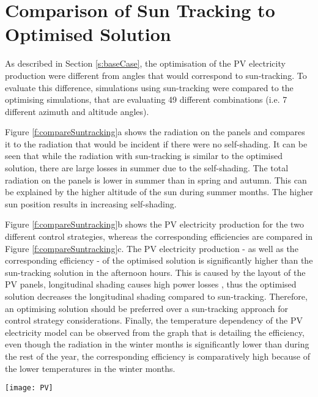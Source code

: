 \section{Comparison of Sun Tracking to Optimised Solution}
\label{s:compareSunTracking}

	As described in Section \ref{s:baseCase}, the optimisation of the PV electricity production were different from angles that would correspond to sun-tracking. To evaluate this difference, simulations using sun-tracking were compared to the optimising simulations, that are evaluating 49 different combinations (i.e. 7 different azimuth and altitude angles). 

	Figure \ref{f:compareSuntracking}a shows the radiation on the panels and compares it to the radiation that would be incident if there were no self-shading. It can be seen that while the radiation with sun-tracking is similar to the optimised solution, there are large losses in summer due to the self-shading. The total radiation on the panels is lower in summer than in spring and autumn. This can be explained by the higher altitude of the sun during summer months. The higher sun position results in increasing self-shading. 

	Figure \ref{f:compareSuntracking}b shows the PV electricity production for the two different control strategies, whereas the corresponding efficiencies are compared in Figure \ref{f:compareSuntracking}c. The PV electricity production - as well as the corresponding efficiency - of the optimised solution is significantly higher than the sun-tracking solution in the afternoon hours. This is caused by the layout of the PV panels, longitudinal shading causes high power losses \cite{hofer2016}, thus the optimised solution decreases the longitudinal shading compared to sun-tracking. Therefore, an optimising solution should be preferred over a sun-tracking approach for control strategy considerations. Finally, the temperature dependency of the PV electricity model can be observed from the graph that is detailing the efficiency, even though the radiation in the winter months is significantly lower than during the rest of the year, the corresponding efficiency is comparatively high because of the lower temperatures in the winter months. 

	\begin{figure*}
		\begin{center}
		\texttt{[image: PV]}
		\caption{Comparison of optimised solution to sun-tracking. (a) Average radiation on panels compared to radiation without shading. While the radiation for sun-tracking is very similar to the radiation with the optimised angles, there are large losses caused by self-shading on the panels. (b) PV electricity production comparison. The optimised solution yields a significantly larger power output. (c) PV efficiency comparison. The optimised solution is able to stay at higher efficiencies than the sun-tracking approach.}
		\label{f:compareSuntracking}
		\end{center}
	\end{figure*}



